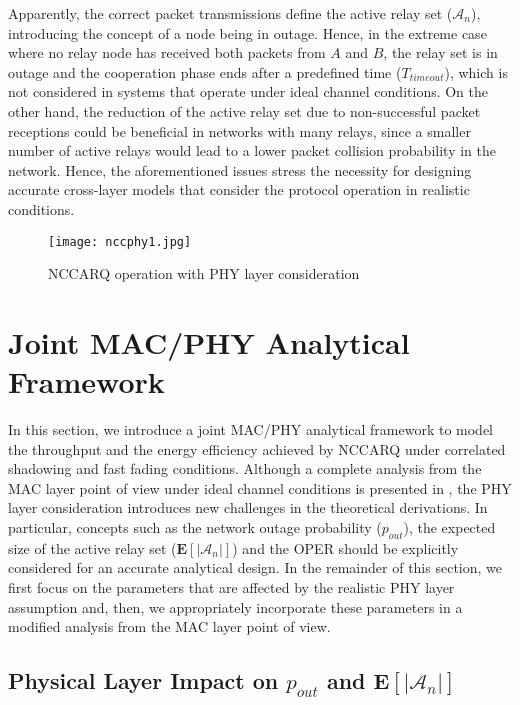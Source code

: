 \documentclass[12pt,draftcls, onecolumn]{IEEEtran}
\begin{document}
Apparently, the correct packet transmissions define the active relay set ($\mathcal{A}_n$), introducing the concept of a node being in outage. Hence, in the extreme case where no relay node has received both packets from $A$ and $B$, the relay set is in outage and the cooperation phase ends after a predefined time ($T_{timeout}$), which is not considered in systems that operate under ideal channel conditions. On the other hand, the reduction of the active relay set due to non-successful packet receptions could be beneficial in networks with many relays, since a smaller number of active relays would lead to a lower packet collision probability in the network. Hence, the aforementioned issues stress the necessity for designing accurate cross-layer models that consider the protocol operation in realistic conditions.


\begin{figure}[htb]
\centering
\texttt{[image: nccphy1.jpg]}
\caption{NCCARQ operation with PHY layer consideration}\label{nccphy}
\end{figure}


\section{Joint MAC/PHY Analytical Framework}
\label{sec:analysis}

In this section, we introduce a joint MAC/PHY analytical framework to model the throughput and the energy efficiency achieved by NCCARQ under correlated shadowing and fast fading conditions. Although a complete analysis from the MAC layer point of view under ideal channel conditions is presented in \cite{nccarq}, the PHY layer consideration introduces new challenges in the theoretical derivations. In particular, concepts such as the network outage probability ($p_{out}$), the expected size of the active relay set ($\mathbf{E}\left[\left|\mathcal{A}_n\right|\right]$) and the OPER should be explicitly considered for an accurate analytical design. In the remainder of this section, we first focus on the parameters that are affected by the realistic PHY layer assumption and, then, we appropriately incorporate these parameters in a modified analysis from the MAC layer point of view.

\subsection{Physical Layer Impact on $p_{out}$ and $\mathbf{E}\left[\left|\mathcal{A}_n\right|\right]$}
\label{sec3}
\end{document}
